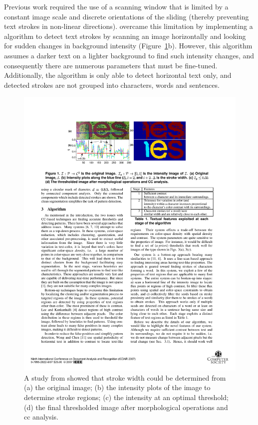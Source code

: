 Previous work required the use of a scanning window \citep{XiangrongChen:2004ha, Lienhart:2002ub, Jung:2009do} that is limited by a constant image scale and discrete orientations of the sliding (thereby preventing text strokes in non-linear directions). \citet{Subramanian:2007tf} overcame this limitation by implementing a algorithm to detect text strokes by scanning an image horizontally and looking for sudden changes in background intensity (Figure~\ref{fig:background:detection:cc:subramanian2007_intensity}b). However, this algorithm assumes a darker text on a lighter background to find such intensity changes, and consequently there are numerous parameters that must be fine-tuned. Additionally, the algorithm is only able to detect horizontal text only, and detected strokes are not grouped into characters, words and sentences.

\begin{figure}[h]
  \centering
  \includegraphics[width=\textwidth]{images/background/subramanian2007_intensity}
  \caption[Stroke analysis from \citet{Subramanian:2007tf}]{A study from \citet{Subramanian:2007tf} showed that stroke width could be determined from (a) the original image; (b) the intensity plots of the image to determine stroke regions; (c) the intensity at an optimal threshold; (d) the final thresholded image after morphological operations and \gls{cc} analysis.}
  \label{fig:background:detection:cc:subramanian2007_intensity}
\end{figure}

